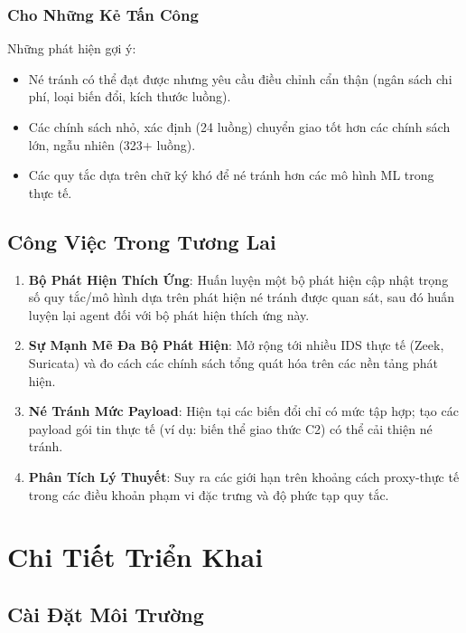 \documentclass[12pt,a4paper]{report}
\begin{document}
\subsection{Cho Những Kẻ Tấn Công}
Những phát hiện gợi ý:
\begin{itemize}
  \item Né tránh có thể đạt được nhưng yêu cầu điều chỉnh cẩn thận (ngân sách chi phí, loại biến đổi, kích thước luồng).
  \item Các chính sách nhỏ, xác định (24 luồng) chuyển giao tốt hơn các chính sách lớn, ngẫu nhiên (323+ luồng).
  \item Các quy tắc dựa trên chữ ký khó để né tránh hơn các mô hình ML trong thực tế.
\end{itemize}

\section{Công Việc Trong Tương Lai}

\begin{enumerate}
  \item \textbf{Bộ Phát Hiện Thích Ứng}: Huấn luyện một bộ phát hiện cập nhật trọng số quy tắc/mô hình dựa trên phát hiện né tránh được quan sát, sau đó huấn luyện lại agent đối với bộ phát hiện thích ứng này.
  
  \item \textbf{Sự Mạnh Mẽ Đa Bộ Phát Hiện}: Mở rộng tới nhiều IDS thực tế (Zeek, Suricata) và đo cách các chính sách tổng quát hóa trên các nền tảng phát hiện.
  
  \item \textbf{Né Tránh Mức Payload}: Hiện tại các biến đổi chỉ có mức tập hợp; tạo các payload gói tin thực tế (ví dụ: biến thể giao thức C2) có thể cải thiện né tránh.
  
  \item \textbf{Phân Tích Lý Thuyết}: Suy ra các giới hạn trên khoảng cách proxy-thực tế trong các điều khoản phạm vi đặc trưng và độ phức tạp quy tắc.
\end{enumerate}




\appendix

\chapter{Chi Tiết Triển Khai}

\section{Cài Đặt Môi Trường}
\end{document}
